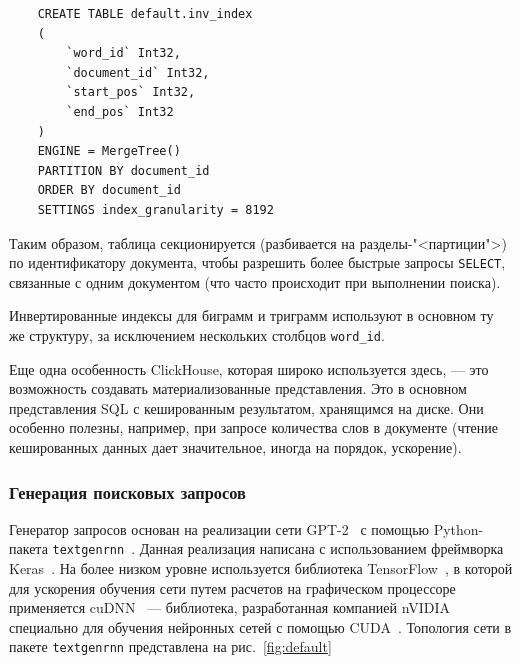 \begin{verbatim}
    CREATE TABLE default.inv_index
    (
        `word_id` Int32,
        `document_id` Int32,
        `start_pos` Int32,
        `end_pos` Int32
    )
    ENGINE = MergeTree()
    PARTITION BY document_id
    ORDER BY document_id
    SETTINGS index_granularity = 8192
\end{verbatim}

Таким образом, таблица секционируется (разбивается на разделы-"<партиции">) по идентификатору документа, чтобы разрешить
более быстрые запросы \texttt{SELECT}, связанные с одним документом (что часто происходит при выполнении поиска).

Инвертированные индексы для биграмм и триграмм используют в основном ту же структуру, за исключением нескольких столбцов
\texttt{word\_id}.

Еще одна особенность ClickHouse, которая широко используется здесь, --- это возможность создавать материализованные представления.
Это в основном представления SQL с кешированным результатом, хранящимся на диске. Они особенно полезны, например, при запросе
количества слов в документе (чтение кешированных данных дает значительное, иногда на порядок, ускорение).

\subsubsection{Генерация поисковых запросов}
Генератор запросов основан на реализации сети GPT-2~\cite{radford2019language} с помощью Python-пакета \texttt{textgenrnn}~\cite{TextgenRNN2020}. 
Данная реализация написана с использованием фреймворка Keras~\cite{chollet2015keras}. На более низком уровне используется
библиотека TensorFlow~\cite{tensorflow2015-whitepaper}, в которой для ускорения обучения сети путем расчетов на графическом процессоре
применяется cuDNN~\cite{DBLP:journals/corr/ChetlurWVCTCS14} --- библиотека, разработанная компанией nVIDIA специально для 
обучения нейронных сетей с помощью CUDA~\cite{cuda}. Топология сети в пакете \texttt{textgenrnn} представлена на рис.~\ref{fig:default}

